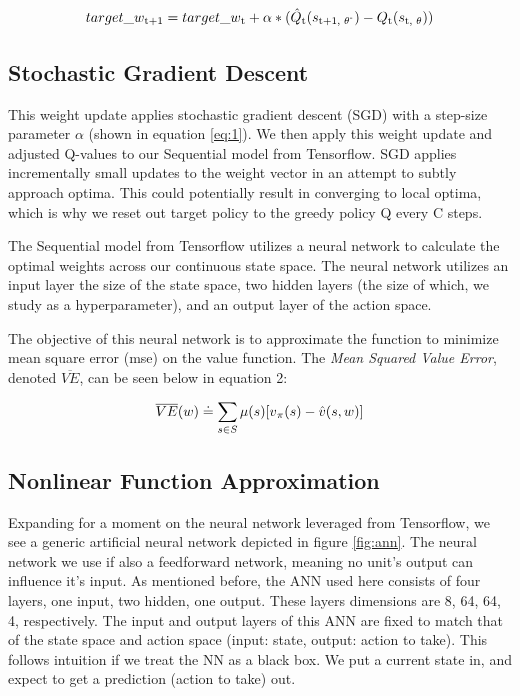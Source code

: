 \documentclass[conference]{IEEEtran}
\begin{document}
\begin{equation}
    \label{eq:1}
    target\_w\textsubscript{t+1} = target\_w\textsubscript{t} + \alpha * (\hat{Q}\textsubscript{t}(s\textsubscript{t+1, $\theta$\textsuperscript{-}}) - Q\textsubscript{t}(s\textsubscript{t, $\theta$}))
\end{equation}

\subsection{Stochastic Gradient Descent}
This weight update applies stochastic gradient descent (SGD) with a step-size parameter $\alpha$ (shown in equation \ref{eq:1}). We then apply this weight update and adjusted Q-values to our Sequential model from Tensorflow. SGD applies incrementally small updates to the weight vector in an attempt to subtly approach optima. This could potentially result in converging to local optima, which is why we reset out target policy  to the greedy policy Q every C steps.

The Sequential model from Tensorflow utilizes a neural network to calculate the optimal weights across our continuous state space. The neural network utilizes an input layer the size of the state space, two hidden layers (the size of which, we study as a hyperparameter), and an output layer of the action space.

The objective of this neural network is to approximate the function to minimize mean square error (mse) on the value function. The \textit{Mean Squared Value Error}, denoted $\overline{VE}$, can be seen below in equation 2:

\begin{equation}
    \label{eq:2}
    \overline{VE}(w) \doteq \sum_{s \in S} \mu(s) [v\textsubscript{$\pi$}(s) - \hat{v}(s, w)]
\end{equation}

\subsection{Nonlinear Function Approximation}
Expanding for a moment on the neural network leveraged from Tensorflow, we see a generic artificial neural network depicted in figure \ref{fig:ann}. The neural network we use if also a feedforward network, meaning no unit's output can influence it's input. As mentioned before, the ANN used here consists of four layers, one input, two hidden, one output. These layers dimensions are 8, 64, 64, 4, respectively. The input and output layers of this ANN are fixed to match that of the state space and action space (input: state, output: action to take). This follows intuition if we treat the NN as a black box. We put a current state in, and expect to get a prediction (action to take) out.
\end{document}
